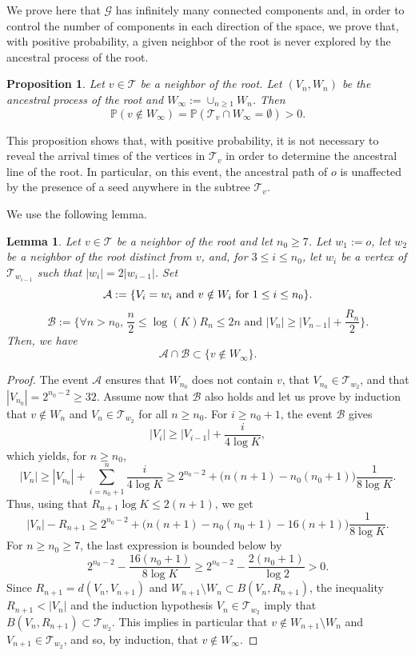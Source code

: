 \documentclass[french]{article}
\newtheorem{prop}[theorem]{Proposition}
\newtheorem{lemma}[theorem]{Lemma}
\renewcommand{\P}{\mathbb{P}}
\newcommand{\T}{\mathcal{T}}
\renewcommand{\1}{\mathds{1}}
\begin{document}
We prove here that $\mathcal{G}$ has infinitely many connected components and, in order  
to control the number of components in each direction of the space, we prove that, 
with positive probability, a given neighbor of the root is never explored by the ancestral process of the root. 


\begin{prop}\label{prop:keyresult} Let $v\in \T$ be a neighbor of the root. Let $(V_n,W_n)$ be the ancestral process of the root and $W_\infty:=\cup_{n\ge 1} W_n$. Then
$$\P(v\notin W_\infty) = \P(\T_v \cap W_\infty = \emptyset) > 0.$$ 
\end{prop}
This proposition shows that, with positive probability, it is not necessary to reveal the arrival times of the vertices in $\T_v$ in order to determine the ancestral line of the root. In particular, on this event, the ancestral path of $o$ is unaffected by the presence of a seed anywhere in the subtree $\T_v$.

\medskip 
We use the following lemma.


\begin{lemma}\label{lemm:AcapB} Let $v\in \T$ be a neighbor of the root and let $n_0\ge 7$. Let $w_1:=o$, let $w_2$ be a neighbor of the root distinct from $v$, and, for $3\le i\le n_0$, let $w_i$ be a vertex of $\T_{w_{i-1}}$ such that $|w_i|=2|w_{i-1}|$. Set 
    $$
    \mathcal{A}:=\{ V_i=w_i \hbox{ and } v \notin W_i\hbox{ for } 1\leq i\le n_0\}.
    $$
    $$\mathcal{B}:=\Big\{\forall n> n_0,\, \frac{n}{2}\le \log(K)R_n \le 2n \mbox{ and } |V_n|\ge |V_{n-1}|+\frac{R_n}{2}\Big\}.$$
Then, we have $$\mathcal{A}\cap \mathcal{B} \subset \{v\notin W_\infty\}.$$
\end{lemma}
\begin{proof} 
The event $\mathcal{A}$ ensures that $W_{n_0}$ does not contain $v$, that $V_{n_0}\in\T_{w_2}$, and that $|V_{n_0}|=2^{n_0-2}\ge 32$. Assume now that $\mathcal{B}$ also holds and let us prove by induction that $v\notin W_n$ and $V_n\in\T_{w_2}$ for all $n\ge n_0$.
For $i\ge n_0+1$, the event $\mathcal{B}$ gives
$$|V_{i}|\ge |V_{i-1}|+\frac{i}{4 \log K},$$
which yields, for $n\ge n_0$,
$$|V_{n}|\ge  |V_{n_0}|+\sum_{i=n_0+1}^n \frac{i}{4 \log K}\ge 2^{n_0-2}+\big(n(n+1)-n_0(n_0+1)\big)\frac{1}{8\log K}.$$
Thus, using that $R_{n+1}\log K\le 2(n+1)$, we get  
$$|V_n|-R_{n+1}\ge 2^{n_0-2}+\big(n(n+1)-n_0(n_0+1)-16(n+1)\big)\frac{1}{8\log K}.$$
For $n\ge n_0\ge 7$, the last expression is bounded below by
$$2^{n_0-2}-\frac{16(n_0+1)}{8\log K}\ge 2^{n_0-2}-\frac{2(n_0+1)}{\log 2}>0.$$
Since $R_{n+1}=d(V_n,V_{n+1})$ and $W_{n+1}\setminus W_n \subset B(V_n,R_{n+1})$, the inequality $R_{n+1}<|V_n|$ and the induction hypothesis $V_n\in\T_{w_2}$ imply that $B(V_n,R_{n+1})\subset\T_{w_2}$. This implies in particular that $v\notin W_{n+1}\setminus W_n$ and $V_{n+1}\in\T_{w_2}$, and so, by induction, that $v\notin W_\infty$.
\end{proof}
\end{document}
